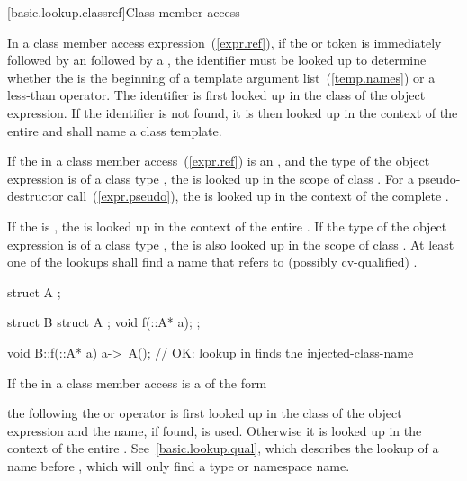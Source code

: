[basic.lookup.classref]{Class member access}

\pnum
{}%
In a class member access expression~(\ref{expr.ref}), if the 
or \tcode{->} token is immediately followed by an 
followed by a \tcode{<}, the identifier must be looked up to determine
whether the \tcode{<} is the beginning of a template argument
list~(\ref{temp.names}) or a less-than operator. The identifier is first
looked up in the class of the object expression. If the identifier is
not found, it is then looked up in the context of the entire
 and shall name a class template.

\pnum
If the  in a class member
access~(\ref{expr.ref}) is an , and the type of
the object expression is of a class type , the
 is looked up in the scope of class .
For a pseudo-destructor call~(\ref{expr.pseudo}),
the  is looked up in the context of the complete
.

\pnum
If the  is \tcode{\~}, the
 is looked up in the context of the entire
. If the type  of the object
expression is of a class type , the  is
also looked up in the scope of class . At least one of the
lookups shall find a name that refers to (possibly cv-qualified)
. \enterexample

\begin{codeblock}
struct A { };

struct B {
  struct A { };
  void f(::A* a);
};

void B::f(::A* a) {
  a->~A();                      // OK: lookup in  finds the injected-class-name
}
\end{codeblock}\exitexample

\pnum
If the  in a class member access is a
 of the form

\begin{indented}
\end{indented}

the  following the  or
\tcode{->} operator is
first looked up in the class of the object expression and the name, if found,
is used. Otherwise it is looked up in the context of the entire
. \enternote See~\ref{basic.lookup.qual}, which
describes the lookup of a name before \tcode{::}, which will only find a type
or namespace name. \exitnote

